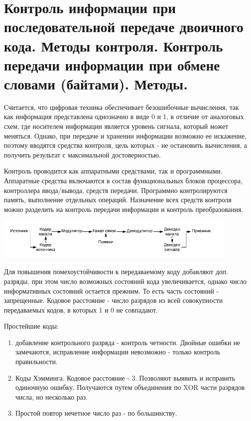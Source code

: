 \documentclass[unicode, 12pt, a4paper, oneside]{article}
\begin{document}
\section{Контроль информации при последовательной передаче двоичного кода. Методы контроля. Контроль передачи информации при обмене словами (байтами). Методы.}

Считается, что цифровая техника обеспечивает безошибочные вычисления, так как информация представлена однозначно в виде 0 и 1, в отличие от аналоговых схем, где носителем информации является уровень сигнала, который может меняться. Однако, при передаче и хранении информации возможно ее искажение, поэтому вводятся средства контроля, цель которых - не остановить вычисления, а получить результат с максимальной достоверностью.

Контроль проводится как аппаратными средствами, так и программными. Аппаратные средства включаются в состав функциональных блоков процессора, контроллера ввода/вывода, средств передачи. Программно контролируются память, выполнение отдельных операций.
Назначение всех средств контроля можно разделить на контроль передачи информации и контроль преобразования.

\begin{center}
\includegraphics[width=0.9\textwidth]{116_Channel.png}\\
\end{center}
Для повышения помехоустойчивости к передаваемому коду добавляют доп. разряды, при этом число возможных состояний кода увеличивается, однако число информативных состояний остается прежним. То есть часть состояний - запрещенные. Кодовое расстояние - число разрядов из всей совокупности передаваемых кодов, в которых 1 и 0 не совпадают.

Простейшие коды:
\begin{enumerate}
\item добавление контрольного разряда - контроль четности. Двойные ошибки не замечаются, исправление информации невозможно - только контроль правильности.
\item Коды Хэмминга. Кодовое расстояние - 3. Позволяют выявить и исправить одиночную ошибку. Получаются путем объединения по XOR части разрядов числа, но несколько раз.
\item Простой повтор нечетное число раз - по большинству.
\end{enumerate}
\end{document}
